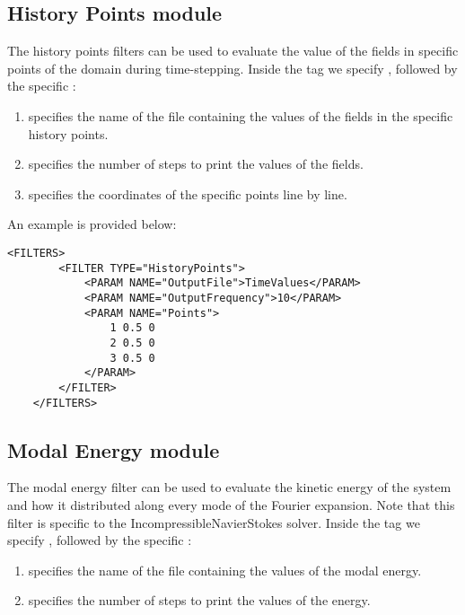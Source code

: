  
\subsection{History Points module}

The history points filters can be used to evaluate the value of the fields in specific points of  the domain during time-stepping.  Inside the  tag we specify , followed by the specific :
 
 \begin{enumerate}
\item {} specifies the name of the file containing the values of the fields in the specific history points.
 \item {} specifies the number of steps to print the values of the fields.
 \item {} specifies the coordinates of the specific points line by line.
 \end{enumerate}

An example is provided below:

\begin{lstlisting}[style=XMLStyle]
    <FILTERS>
        <FILTER TYPE="HistoryPoints">
            <PARAM NAME="OutputFile">TimeValues</PARAM>
            <PARAM NAME="OutputFrequency">10</PARAM>
            <PARAM NAME="Points">
                1 0.5 0
                2 0.5 0
                3 0.5 0
            </PARAM>
        </FILTER>
    </FILTERS>
 \end{lstlisting}


\subsection{Modal Energy module}

The modal energy filter can be used to evaluate the kinetic energy of the system and how it distributed along every mode of the Fourier expansion.  Note that this filter is specific to the IncompressibleNavierStokes solver. Inside the  tag we specify , followed by the specific :

 \begin{enumerate}
\item {} specifies the name of the file containing the values of the modal energy.
 \item {} specifies the number of steps to print the values of the energy.
 \end{enumerate}

